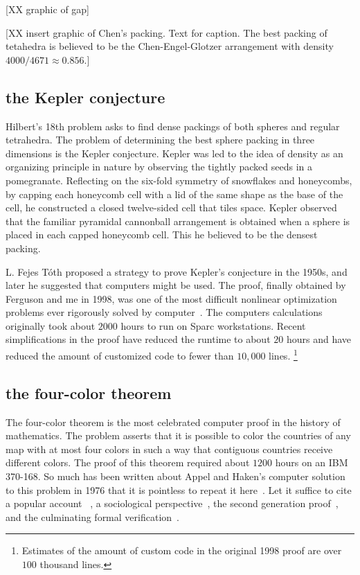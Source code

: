 \documentclass{llncs}
\begin{document}
[XX graphic of gap]

[XX insert graphic of Chen's packing.  Text for caption.  The best packing of
tetahedra is believed to be the Chen-Engel-Glotzer arrangement with density
$4000/4671\approx 0.856$.]

\subsection{the Kepler conjecture}

Hilbert's 18th problem asks to find dense packings of both spheres and regular tetrahedra.
The problem of determining the best sphere packing in three dimensions
is the Kepler conjecture.  Kepler was led to the idea of density as an
organizing principle in nature by observing the tightly packed seeds
in a pomegranate.  Reflecting on the six-fold symmetry of snowflakes
and honeycombs, by capping each honeycomb cell with a
lid of the same shape as the base of the cell, he constructed a closed twelve-sided cell 
 that tiles space.  Kepler observed that the familiar pyramidal cannonball
arrangement is obtained when a sphere is placed in each capped
honeycomb cell.  This he  believed to be the densest packing.


L. Fejes T\'oth proposed a strategy to prove Kepler's conjecture in
the 1950s, and later he suggested that computers might be used.  The
proof, finally obtained by Ferguson and me in 1998, was one of the
most difficult nonlinear optimization problems ever rigorously solved
by computer~\cite{Hales:2005:Annals}.  The computers calculations
originally took about $2000$ hours to run on Sparc workstations.
Recent simplifications in the proof have reduced the runtime to about
$20$ hours and have reduced the amount of customized code to fewer
than $10,000$ lines.%
\footnote{Estimates of the amount of custom code in the original 1998
  proof are over $100$ thousand lines.}


\subsection{the four-color theorem}

The four-color theorem is the most celebrated computer proof in the
history of mathematics.  The problem asserts that it is possible to
color the countries of any map with at most four colors in such a way
that contiguous countries receive different colors.  The proof of this
theorem required about $1200$ hours on an IBM 370-168. So much has
been written about Appel and Haken's computer solution to this problem
in 1976 that it is pointless to repeat it here~\cite{AH4CT}.  Let it
suffice to cite a popular account ~\cite{Wil4CT}, a sociological
perspective~\cite{Mac}, the second generation
proof~\cite{Robertson:1997:JCTB}, and the culminating formal
verification~\cite{gonthier:2008:formal}.
\end{document}
